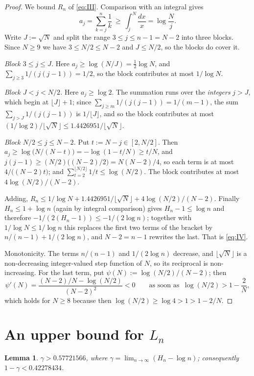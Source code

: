 \documentclass[11pt]{amsart}
\newtheorem{lemma}[theorem]{Lemma}
\newcommand{\Hn}{H}
\begin{document}
\begin{proof}
We bound $R_n$ of \eqref{eq:III}. Comparison with an integral gives
\[
 a_j=\sum_{k=j}^{n}\frac1k\ \ge\ \int_j^{N}\frac{dx}{x}=\log\frac{N}{j} .
\]
Write $J:=\sqrt N$ and split the range $3\le j\le n-1=N-2$ into three blocks. Since
$N\ge9$ we have $3\le N/2\le N-2$ and $J\le N/2$, so the blocks do cover it.

\emph{Block $3\le j\le J$.} Here $a_j\ge\log(N/J)=\tfrac12\log N$, and
$\sum_{j\ge3}1/(j(j-1))=1/2$, so the block contributes at most $1/\log N$.

\emph{Block $J<j<N/2$.} Here $a_j\ge\log2$. The summation runs over the \emph{integers}
$j>J$, which begin at $\lfloor J\rfloor+1$; since $\sum_{j\ge m}1/(j(j-1))=1/(m-1)$, the
sum $\sum_{j>J}1/(j(j-1))$ is $1/\lfloor J\rfloor$, and so the block contributes at most
$(1/\log 2)/\lfloor\sqrt N\rfloor\le1.4426951/\lfloor\sqrt N\rfloor$.

\emph{Block $N/2\le j\le N-2$.} Put $t:=N-j\in[2,N/2]$. Then
$a_j\ge\log\bigl(N/(N-t)\bigr)=-\log(1-t/N)\ge t/N$, and
$j(j-1)\ge(N/2)\bigl((N-2)/2\bigr)=N(N-2)/4$, so each term is at most
$4/\bigl((N-2)t\bigr)$; and $\sum_{t=2}^{\lfloor N/2\rfloor}1/t\le\log(N/2)$. The block
contributes at most $4\log(N/2)/(N-2)$.

Adding, $R_n\le 1/\log N+1.4426951/\lfloor\sqrt N\rfloor+4\log(N/2)/(N-2)$. Finally
$\Hn_n\le1+\log n$ (again by integral comparison) gives $\Hn_n-1\le\log n$ and therefore
$-1/(2(\Hn_n-1))\le-1/(2\log n)$; together with $1/\log N\le1/\log n$ this replaces the
first two terms of the bracket by $n/(n-1)+1/(2\log n)$, and $N-2=n-1$ rewrites the last.
That is \eqref{eq:IV}.

Monotonicity. The terms $n/(n-1)$ and $1/(2\log n)$ decrease, and
$\lfloor\sqrt N\rfloor$ is a non-decreasing integer-valued step function of $N$, so its
reciprocal is non-increasing. For the last term, put $\psi(N):=\log(N/2)/(N-2)$; then
\[
 \psi'(N)=\frac{(N-2)/N-\log(N/2)}{(N-2)^2}<0
 \qquad\text{as soon as }\ \log(N/2)>1-\frac2N ,
\]
which holds for $N\ge8$ because then $\log(N/2)\ge\log4>1>1-2/N$.
\end{proof}

\section{An upper bound for $L_n$}

\begin{lemma}\label{lem:gamma}
$\gamma>0.57721566$, where $\gamma=\lim_{n\to\infty}(\Hn_n-\log n)$; consequently
$1-\gamma<0.42278434$.
\end{lemma}
\end{document}
